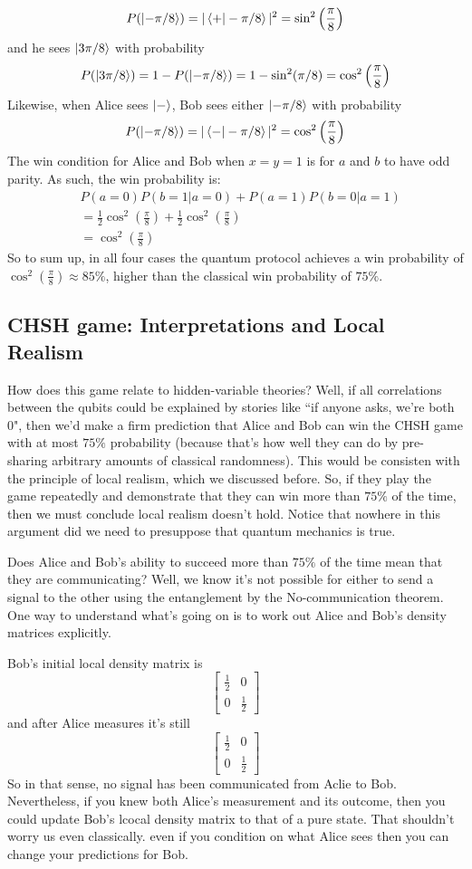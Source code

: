 \[
P(\ket{-\pi/8})=|\braket{+|-\pi/8}|^2=\sin^2\left(\frac{\pi}{8}\right)
\]
and he sees $\ket{3\pi/8}$ with probability
\[
P(\ket{3\pi/8})=1-P(\ket{-\pi/8})=1-\sin^2(\pi/8)=\cos^2\left(\frac{\pi}{8}\right)
\]
Likewise, when Alice sees $\ket{-}$, Bob sees either $\ket{-\pi/8}$ with probability
\[
P(\ket{-\pi/8})=|\braket{-|-\pi/8}|^2=\cos^2\left(\frac{\pi}{8}\right)
\]
The win condition for Alice and Bob when $x=y=1$ is for $a$ and $b$ to have odd parity. As such, the win probability is:
\begin{align*}
    &P(a=0)P(b=1|a=0)+P(a=1)P(b=0|a=1)\\
    &=\frac{1}{2}\cos^2\left(\frac{\pi}{8}\right)+\frac{1}{2}\cos^2\left(\frac{\pi}{8}\right)\\
    &=\cos^2\left(\frac{\pi}{8}\right)
\end{align*}
So to sum up, in all four cases the quantum protocol achieves a win probability of $\cos^2\left(\frac{\pi}{8}\right)\approx 85\%$, higher than the classical win probability of $75\%$.

\subsection*{CHSH game: Interpretations and Local Realism}
How does this game relate to hidden-variable theories? Well, if all correlations between the qubits could be explained by stories like ``if anyone asks, we're both 0", then we'd make a firm prediction that Alice and Bob can win the CHSH game with at most $75\%$ probability (because that's how well they can do by pre-sharing arbitrary amounts of classical randomness). This would be consisten with the principle of local realism, which we discussed before. So, if they play the game repeatedly and demonstrate that they can win more than $75\%$ of the time, then we must conclude local realism doesn't hold. Notice that nowhere in this argument did we need to presuppose that quantum mechanics is true.

Does Alice and Bob's ability to succeed more than $75\%$ of the time mean that they are communicating? Well, we know it's not possible for either to send a signal to the other using the entanglement by the No-communication theorem. One way to understand what's going on is to work out Alice and Bob's density matrices explicitly.

Bob's initial local density matrix is
\[
\begin{bmatrix}
    \frac{1}{2} & 0 \\
    0 & \frac{1}{2}
\end{bmatrix}
\]
and after Alice measures it's still
\[
\begin{bmatrix}
    \frac{1}{2} & 0 \\
    0 & \frac{1}{2}
\end{bmatrix}
\]
So in that sense, no signal has been communicated from Aclie to Bob. Nevertheless, if you knew both Alice's  measurement and its outcome, then you could update Bob's lcocal density matrix to that of a pure state. That shouldn't worry us even classically. even if you condition on what Alice sees then you can change your predictions for Bob.

